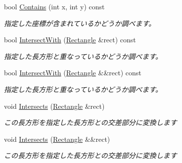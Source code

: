 \begin{DoxyCompactItemize}
bool \hyperlink{struct_shape_1_1_rectangle_ab3879abb2035ecc5c9e5884a259f211e}{Contains} (int x, int y) const 
\begin{DoxyCompactList}\small\item\em 指定した座標が含まれているかどうか調べます。\end{DoxyCompactList}\item 
bool \hyperlink{struct_shape_1_1_rectangle_aee627021d3de333d78cb16aa8d39947f}{Intersect\+With} (\hyperlink{struct_shape_1_1_rectangle}{Rectangle} \&rect) const 
\begin{DoxyCompactList}\small\item\em 指定した長方形と重なっているかどうか調べます。\end{DoxyCompactList}\item 
bool \hyperlink{struct_shape_1_1_rectangle_ae36dfd5b076060d3672cb7cb9bf44225}{Intersect\+With} (\hyperlink{struct_shape_1_1_rectangle}{Rectangle} \&\&rect) const 
\begin{DoxyCompactList}\small\item\em 指定した長方形と重なっているかどうか調べます。\end{DoxyCompactList}\item 
void \hyperlink{struct_shape_1_1_rectangle_a5dcfa2784c8b1c027bd006c333842de6}{Intersects} (\hyperlink{struct_shape_1_1_rectangle}{Rectangle} \&rect)
\begin{DoxyCompactList}\small\item\em この長方形を指定した長方形との交差部分に変換します\end{DoxyCompactList}\item 
void \hyperlink{struct_shape_1_1_rectangle_aa48a803f46a25684a96aa844a907ac39}{Intersects} (\hyperlink{struct_shape_1_1_rectangle}{Rectangle} \&\&rect)
\begin{DoxyCompactList}\small\item\em この長方形を指定した長方形との交差部分に変換します\end{DoxyCompactList}\end{DoxyCompactItemize}
